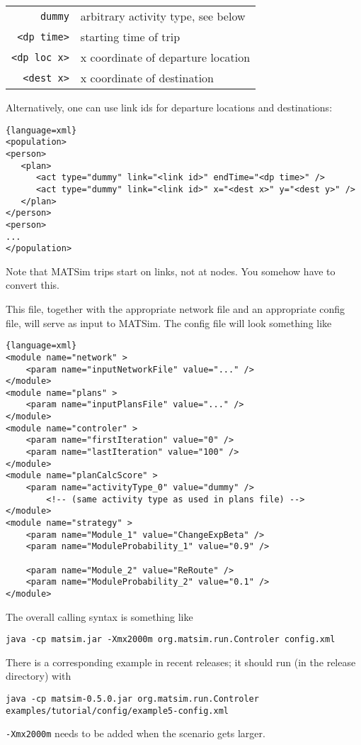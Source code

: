\begin{tabularx}{\hsize}{rX}
\verb$dummy$ & arbitrary activity type, see below \\
\verb$<dp time>$ & starting time of trip \\
\verb$<dp loc x>$ & x coordinate of departure location \\
\verb$<dest x>$ & x coordinate of destination \\
\end{tabularx}

Alternatively, one can use link ids for departure locations and destinations:
\begin{lstlisting}{language=xml}
<population>
<person>
   <plan>
      <act type="dummy" link="<link id>" endTime="<dp time>" />
      <act type="dummy" link="<link id>" x="<dest x>" y="<dest y>" />
   </plan>
</person>
<person>
...
</population>
\end{lstlisting}

Note that MATSim trips start on links, not at nodes.  You somehow have to convert this.

This file, together with the appropriate network file and an appropriate config file, will serve as input to MATSim.  The config file will look something like
\begin{lstlisting}{language=xml}
<module name="network" >
	<param name="inputNetworkFile" value="..." /> 
</module>
<module name="plans" >
	<param name="inputPlansFile" value="..." />
</module>
<module name="controler" >
	<param name="firstIteration" value="0" />
	<param name="lastIteration" value="100" />
</module>
<module name="planCalcScore" >
	<param name="activityType_0" value="dummy" />
        <!-- (same activity type as used in plans file) -->
</module>
<module name="strategy" >
	<param name="Module_1" value="ChangeExpBeta" />
	<param name="ModuleProbability_1" value="0.9" />

	<param name="Module_2" value="ReRoute" />
	<param name="ModuleProbability_2" value="0.1" />
</module>
\end{lstlisting}

The overall calling syntax is something like
\begin{lstlisting}
java -cp matsim.jar -Xmx2000m org.matsim.run.Controler config.xml 
\end{lstlisting}

There is a corresponding example in recent releases; it should run (in the release directory) with 
\begin{lstlisting}
java -cp matsim-0.5.0.jar org.matsim.run.Controler examples/tutorial/config/example5-config.xml
\end{lstlisting}
\verb$-Xmx2000m$ needs to be added when the scenario gets larger.

